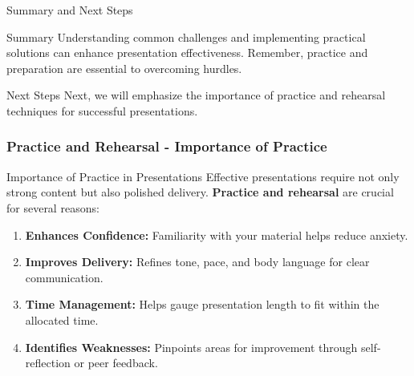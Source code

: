 \documentclass[aspectratio=169]{beamer}
\begin{document}
\begin{frame}[fragile]{Summary and Next Steps}
    \begin{block}{Summary}
        Understanding common challenges and implementing practical solutions can enhance presentation effectiveness.
        Remember, practice and preparation are essential to overcoming hurdles.
    \end{block}

    \begin{block}{Next Steps}
        Next, we will emphasize the importance of practice and rehearsal techniques for successful presentations.
    \end{block}
\end{frame}

\begin{frame}[fragile]
    \frametitle{Practice and Rehearsal - Importance of Practice}

    \begin{block}{Importance of Practice in Presentations}
        Effective presentations require not only strong content but also polished delivery. 
        \textbf{Practice and rehearsal} are crucial for several reasons:
    \end{block}

    \begin{enumerate}
        \item \textbf{Enhances Confidence:} Familiarity with your material helps reduce anxiety.
        \item \textbf{Improves Delivery:} Refines tone, pace, and body language for clear communication.
        \item \textbf{Time Management:} Helps gauge presentation length to fit within the allocated time.
        \item \textbf{Identifies Weaknesses:} Pinpoints areas for improvement through self-reflection or peer feedback.
    \end{enumerate}
\end{frame}
\end{document}
